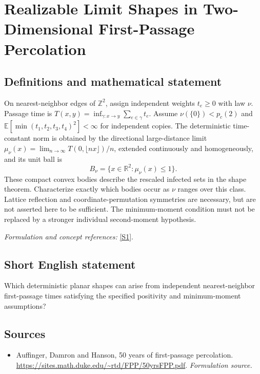\documentclass[11pt]{article}
\begin{document}
\section*{\texorpdfstring{Realizable Limit Shapes in Two-Dimensional First-Passage Percolation}{Realizable Limit Shapes in Two-Dimensional First-Passage Percolation}}\label{30006922}
\subsection{Definitions and mathematical statement}
On nearest-neighbor edges of ${\mathbb{Z}}^2$, assign independent weights $t_e\ge0$ with law $\nu$. Passage time is $T(x,y)=\inf_{\gamma:x\to y}\sum_{e\in\gamma}t_e$. Assume $\nu(\{0\})<p_c(2)$ and ${\mathbb{E}}[\min(t_1,t_2,t_3,t_4)^2]<\infty$ for independent copies. The deterministic time-constant norm is obtained by the directional large-distance limit $\mu_\nu(x)=\lim_{n\to\infty}T(0,\lfloor nx\rfloor)/n$, extended continuously and homogeneously, and its unit ball is
\[
 B_\nu=\{x\in{\mathbb{R}}^2:\mu_\nu(x)\le1\}.
\]
These compact convex bodies describe the rescaled infected sets in the shape theorem. Characterize exactly which bodies occur as $\nu$ ranges over this class. Lattice reflection and coordinate-permutation symmetries are necessary, but are not asserted here to be sufficient. The minimum-moment condition must not be replaced by a stronger individual second-moment hypothesis.
\par\smallskip\textit{Formulation and concept references:} \href{https://sites.math.duke.edu/~rtd/FPP/50yrsFPP.pdf}{[S1]}.

\subsection{Short English statement}
Which deterministic planar shapes can arise from independent nearest-neighbor first-passage times satisfying the specified positivity and minimum-moment assumptions?
\subsection{Sources}
\begin{itemize}
\item[S1]Auffinger, Damron and Hanson, 50 years of first-passage percolation.
\url{https://sites.math.duke.edu/~rtd/FPP/50yrsFPP.pdf}.
\textit{Formulation source.}
\end{itemize}
\end{document}
